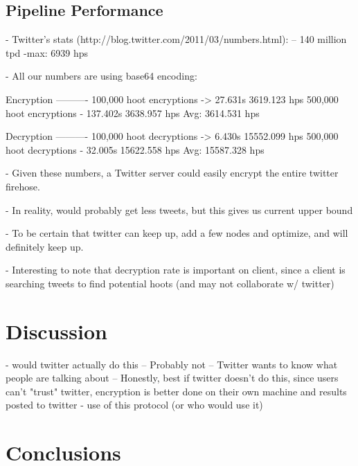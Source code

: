 \documentclass{acm_proc_article-sp}
\begin{document}
\subsection{Pipeline Performance}

- Twitter's stats (http://blog.twitter.com/2011/03/numbers.html):
	-- 140 million tpd
	-max: 6939 hps
	
- All our numbers are using base64 encoding:

Encryption
----------
100,000 hoot encryptions -> 27.631s        3619.123 hps
500,000 hoot encryptions - 137.402s        3638.957 hps
Avg: 3614.531 hps

Decryption
----------
100,000 hoot decryptions -> 6.430s         15552.099 hps
500,000 hoot decryptions - 32.005s         15622.558 hps
Avg: 15587.328 hps

- Given these numbers, a Twitter server could easily encrypt the entire twitter firehose.

- In reality, would probably get less tweets, but this gives us current upper bound

- To be certain that twitter can keep up, add a few nodes and optimize, and will definitely keep up.

- Interesting to note that decryption rate is important on client, since a client is searching tweets to find potential hoots (and may not collaborate w/ twitter)



\section{Discussion}

- would twitter actually do this
	-- Probably not
	-- Twitter wants to know what people are talking about
	-- Honestly, best if twitter doesn't do this, since users can't "trust" twitter, encryption is better done on their own machine and results posted to twitter
- use of this protocol (or who would use it)

\section{Conclusions}






\balancecolumns
\end{document}
